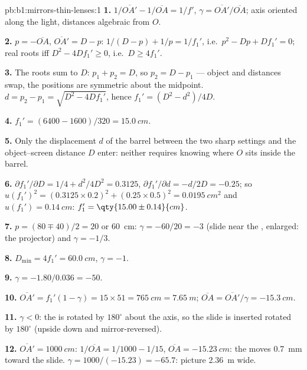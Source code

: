 \begin{solution}{pb:b1:mirrors-thin-lenses:1}
\textbf{1.} $1/\overline{OA'} - 1/\overline{OA} = 1/f'$,
$\gamma = \overline{OA'}/\overline{OA}$; axis oriented along the light,
distances algebraic from $O$.

\textbf{2.} $p = -\overline{OA}$, $\overline{OA'} = D - p$:
$1/(D - p) + 1/p = 1/f_1'$, i.e.\ $p^2 - Dp + Df_1' = 0$; real roots iff
$D^2 - 4Df_1' \geq 0$, i.e.\ $D \geq 4f_1'$.

\textbf{3.} The roots sum to $D$: $p_1 + p_2 = D$, so $p_2 = D - p_1$ ---
object and  distances swap, the positions are symmetric about the
midpoint. $d = p_2 - p_1 = \sqrt{D^2 - 4Df_1'}$, hence $f_1' = (D^2 -
d^2)/4D$.

\textbf{4.} $f_1' = (6400 - 1600)/320 = \qty{15.0}{cm}$.

\textbf{5.} Only the displacement $d$ of the barrel between the two
sharp settings and the object--screen distance $D$ enter: neither
requires knowing where $O$ sits inside the barrel.

\textbf{6.} $\partial f_1'/\partial D = 1/4 + d^2/4D^2 = 0.3125$,
$\partial f_1'/\partial d = -d/2D = -0.25$; so
$u(f_1')^2 = (0.3125 \times 0.2)^2 + (0.25 \times 0.5)^2 =
\qty{0.0195}{cm^2}$ and $u(f_1') = \qty{0.14}{cm}$:
$f_1' = \qty{15.00\pm0.14}{cm}$.

\textbf{7.} $p = (80 \mp 40)/2 = 20$ or \qty{60}{cm}: $\gamma =
-60/20 = -3$ (slide near the , enlarged: the projector) and
$\gamma = -1/3$.

\textbf{8.} $D_{\min} = 4f_1' = \qty{60.0}{cm}$, $\gamma = -1$.

\textbf{9.} $\gamma = -1.80/0.036 = -50$.

\textbf{10.} $\overline{OA'} = f_1'(1 - \gamma) = 15 \times 51 =
\qty{765}{cm} = \qty{7.65}{m}$; $\overline{OA} = \overline{OA'}/\gamma =
\qty{-15.3}{cm}$.

\textbf{11.} $\gamma < 0$: the  is rotated by $180^\circ$
about the axis, so the slide is inserted rotated by $180^\circ$ (upside
down and mirror-reversed).

\textbf{12.} $\overline{OA'} = \qty{1000}{cm}$: $1/\overline{OA} = 1/1000
- 1/15$, $\overline{OA} = \qty{-15.23}{cm}$: the  moves \qty{0.7}{mm}
toward the slide. $\gamma = 1000/(-15.23) = -65.7$: picture
\qty{2.36}{m} wide.


\end{solution}
